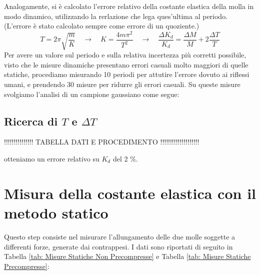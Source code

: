 \documentclass[12pt, a4paper]{article}
\begin{document}
Analogamente, si è calcolato l'errore relativo della costante elastica della molla in modo dinamico, utilizzando la rerlazione che lega ques'ultima al periodo. (L'errore è stato calcolato sempre come errore di un quoziente.) 
\begin{equation*}
    T = 2\pi\sqrt{\frac{m}{K}} \quad \xrightarrow{} \quad K = \frac{4m\pi^2}{T^2} \quad \xrightarrow{} \quad
    \frac{\Delta K_d}{K_d}=\frac{\Delta M}{M}+2\frac{\Delta T}{T}
\end{equation*}
Per avere un valore sul periodo e sulla relativa incertezza più corretti possibile, visto che le misure
dinamiche presentano errori casuali molto maggiori di quelle statiche, procediamo misurando 10 periodi per 
attutire l'errore dovuto ai riflessi umani, e prendendo 30 misure per ridurre gli errori casuali.
Su queste misure svolgiamo l'analisi di un campione gaussiano come segue:

\subsection{Ricerca di $T$ e $\Delta T$}
!!!!!!!!!!!!!!! TABELLA DATI E PROCEDIMENTO !!!!!!!!!!!!!!!!!!!!

otteniamo un errore relativo su $K_d$ del 2 \%.





\section{Misura della costante elastica con il metodo statico}
Questo step consiste nel misurare l'allungamento delle due molle soggette a differenti forze, generate dai contrappesi. I dati sono riportati di seguito in Tabella \ref{tab: Misure Statiche Non Precompresse} e Tabella \ref{tab: Misure Statiche Precompresse}:\\
\end{document}

